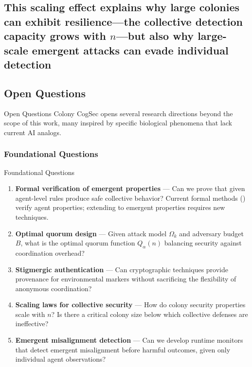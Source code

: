 \documentclass[
  ignorenonframetext,
]{beamer}
\providecommand{\cref}[1]{\texttt{\detokenize{#1}}}
\begin{document}
\subsection{\texorpdfstring{This scaling effect explains why large
colonies can exhibit resilience---the collective detection capacity
grows with \(n\)---but also why large-scale emergent attacks can evade
individual
detection}{This scaling effect explains why large colonies can exhibit resilience---the collective detection capacity grows with n---but also why large-scale emergent attacks can evade individual detection}}\label{this-scaling-effect-explains-why-large-colonies-can-exhibit-resiliencethe-collective-detection-capacity-grows-with-nbut-also-why-large-scale-emergent-attacks-can-evade-individual-detection}

\subsection{Open Questions}\label{sec:eusocial-open-questions}

\begin{frame}[allowframebreaks]{Open Questions}
Colony CogSec opens several research directions beyond the scope of this
work, many inspired by specific biological phenomena that lack current
AI analogs.
\end{frame}

\subsubsection{Foundational Questions}\label{foundational-questions}

\begin{frame}[allowframebreaks]{Foundational Questions}
\begin{enumerate}
\item
  \textbf{Formal verification of emergent properties} --- Can we prove
  that given agent-level rules produce safe collective behavior? Current
  formal methods (\cref{sec:formal-verification}) verify agent
  properties; extending to emergent properties requires new techniques.
\item
  \textbf{Optimal quorum design} --- Given attack model \(\Omega_k\) and
  adversary budget \(B\), what is the optimal quorum function
  \(Q_\alpha(n)\) balancing security against coordination overhead?
\item
  \textbf{Stigmergic authentication} --- Can cryptographic techniques
  provide provenance for environmental markers without sacrificing the
  flexibility of anonymous coordination?
\item
  \textbf{Scaling laws for collective security} --- How do colony
  security properties scale with \(n\)? Is there a critical colony size
  below which collective defenses are ineffective?
\item
  \textbf{Emergent misalignment detection} --- Can we develop runtime
  monitors that detect emergent misalignment before harmful outcomes,
  given only individual agent observations?
\end{enumerate}
\end{frame}
\end{document}
